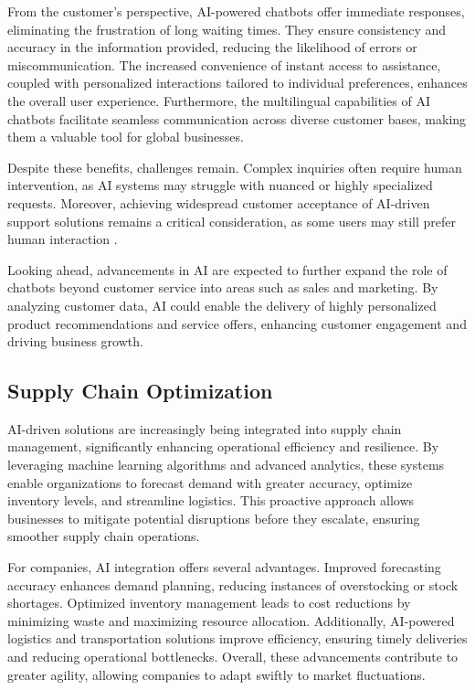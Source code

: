 From the customer’s perspective, AI-powered chatbots offer immediate responses, eliminating the frustration of long waiting times. They ensure consistency and accuracy in the information provided, reducing the likelihood of errors or miscommunication. The increased convenience of instant access to assistance, coupled with personalized interactions tailored to individual preferences, enhances the overall user experience. Furthermore, the multilingual capabilities of AI chatbots facilitate seamless communication across diverse customer bases, making them a valuable tool for global businesses.  

Despite these benefits, challenges remain. Complex inquiries often require human intervention, as AI systems may struggle with nuanced or highly specialized requests. Moreover, achieving widespread customer acceptance of AI-driven support solutions remains a critical consideration, as some users may still prefer human interaction \cite{Customer-Service-AI-Chatbots}.  

Looking ahead, advancements in AI are expected to further expand the role of chatbots beyond customer service into areas such as sales and marketing. By analyzing customer data, AI could enable the delivery of highly personalized product recommendations and service offers, enhancing customer engagement and driving business growth.


\subsection{Supply Chain Optimization}
\label{subsec:supply-chain-optimization}
AI-driven solutions are increasingly being integrated into supply chain management, significantly enhancing operational efficiency and resilience. By leveraging machine learning algorithms and advanced analytics, these systems enable organizations to forecast demand with greater accuracy, optimize inventory levels, and streamline logistics. This proactive approach allows businesses to mitigate potential disruptions before they escalate, ensuring smoother supply chain operations.

For companies, AI integration offers several advantages. Improved forecasting accuracy enhances demand planning, reducing instances of overstocking or stock shortages. Optimized inventory management leads to cost reductions by minimizing waste and maximizing resource allocation. Additionally, AI-powered logistics and transportation solutions improve efficiency, ensuring timely deliveries and reducing operational bottlenecks. Overall, these advancements contribute to greater agility, allowing companies to adapt swiftly to market fluctuations.

